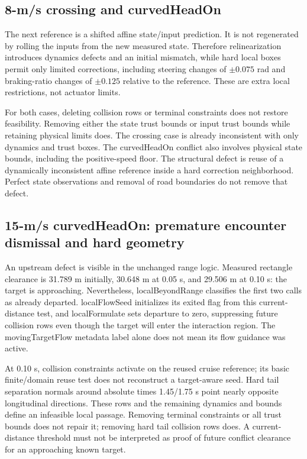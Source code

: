 \documentclass[11pt]{article}
\begin{document}
\subsection{8-m/s crossing and curvedHeadOn}
The next reference is a shifted affine state/input prediction. It is not
regenerated by rolling the inputs from the new measured state. Therefore
relinearization introduces dynamics defects and an initial mismatch, while
hard local boxes permit only limited corrections, including steering changes
of $\pm0.075$ rad and braking-ratio changes of $\pm0.125$ relative to the
reference. These are extra local restrictions, not actuator limits.

For both cases, deleting collision rows or terminal constraints does not
restore feasibility. Removing either the state trust bounds or input trust
bounds while retaining physical limits does. The crossing case is already
inconsistent with only dynamics and trust boxes. The curvedHeadOn conflict
also involves physical state bounds, including the positive-speed floor.
The structural defect is reuse of a dynamically inconsistent affine reference
inside a hard correction neighborhood. Perfect state observations and removal
of road boundaries do not remove that defect.

\subsection{15-m/s curvedHeadOn: premature encounter dismissal and hard geometry}
An upstream defect is visible in the unchanged range logic. Measured rectangle
clearance is 31.789 m initially, 30.648 m at 0.05 s, and 29.506 m at 0.10 s:
the target is approaching. Nevertheless, localBeyondRange classifies the
first two calls as already departed. localFlowSeed initializes its exited
flag from this current-distance test, and localFormulate sets departure to
zero, suppressing future collision rows even though the target will enter
the interaction region. The movingTargetFlow metadata label alone does not
mean its flow guidance was active.

At 0.10 s, collision constraints activate on the reused cruise reference;
its basic finite/domain reuse test does not reconstruct a target-aware seed.
Hard tail separation normals around absolute times 1.45/1.75 s point nearly
opposite longitudinal directions. These rows and the remaining dynamics and
bounds define an infeasible local passage. Removing terminal constraints or
all trust bounds does not repair it; removing hard tail collision rows does.
A current-distance threshold must not be interpreted as proof of future
conflict clearance for an approaching known target.
\end{document}
